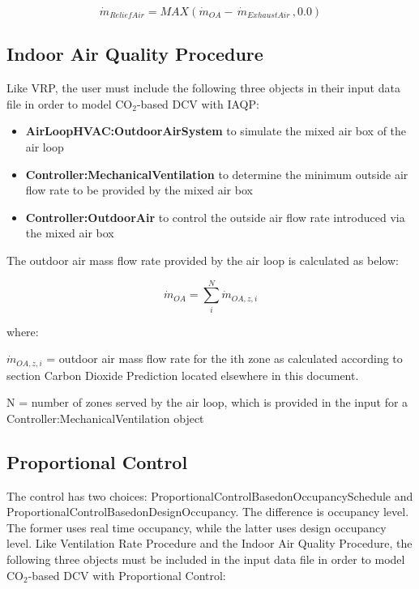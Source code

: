 \begin{equation}
{\dot m_{ReliefAir}} = MAX\left( {{{\dot m}_{OA}} - \,{{\dot m}_{ExhaustAir}}\,,0.0} \right)
\end{equation}

\subsection{Indoor Air Quality Procedure}\label{indoor-air-quality-procedure}

Like VRP, the user must include the following three objects in their input data file in order to model CO\(_{2}\)-based DCV with IAQP:

\begin{itemize}
  \item \textbf{AirLoopHVAC:OutdoorAirSystem} to simulate the mixed air box of the air loop
  \item \textbf{Controller:MechanicalVentilation} to determine the minimum outside air flow rate to be provided by the mixed air box
  \item \textbf{Controller:OutdoorAir} to control the outside air flow rate introduced via the mixed air box
\end{itemize}

The outdoor air mass flow rate provided by the air loop is calculated as below:

\begin{equation}
{\dot m_{OA}} = \sum\limits_i^N {{{\dot m}_{OA,z,i}}}
\end{equation}

where:

\({\dot m_{OA,z,i}}\) = outdoor air mass flow rate for the ith zone as calculated according to section Carbon Dioxide Prediction located elsewhere in this document.

N = number of zones served by the air loop, which is provided in the input for a Controller:MechanicalVentilation object

\subsection{Proportional Control}\label{proportional-control}

The control has two choices: ProportionalControlBasedonOccupancySchedule and ProportionalControlBasedonDesignOccupancy. The difference is occupancy level. The former uses real time occupancy, while the latter uses design occupancy level. Like Ventilation Rate Procedure and the Indoor Air Quality Procedure, the following three objects must be included in the input data file in order to model CO\(_{2}\)-based DCV with Proportional Control:

